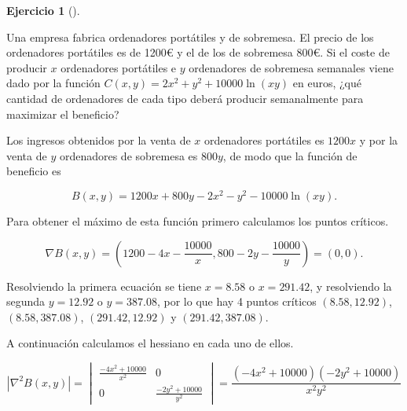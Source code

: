 \documentclass[
  spanish,
  a4paper,
]{scrreport}
\theoremstyle{definition}
\newtheorem{exercise}{Ejercicio}[chapter]
\theoremstyle{remark}
\begin{document}
\begin{exercise}[]\protect\hypertarget{exr-maximizacion-beneficio}{}\label{exr-maximizacion-beneficio}

Una empresa fabrica ordenadores portátiles y de sobremesa. El precio de
los ordenadores portátiles es de 1200€ y el de los de sobremesa 800€. Si
el coste de producir \(x\) ordenadores portátiles e \(y\) ordenadores de
sobremesa semanales viene dado por la función
\(C(x,y)=2x^2+y^2+10000\ln(xy)\) en euros, ¿qué cantidad de ordenadores
de cada tipo deberá producir semanalmente para maximizar el beneficio?

\end{exercise}

\begin{tcolorbox}[enhanced jigsaw, arc=.35mm, bottomrule=.15mm, bottomtitle=1mm, breakable, colback=white, colbacktitle=quarto-callout-tip-color!10!white, colframe=quarto-callout-tip-color-frame, coltitle=black, left=2mm, leftrule=.75mm, opacityback=0, opacitybacktitle=0.6, rightrule=.15mm, title=\textcolor{quarto-callout-tip-color}{\faLightbulb}\hspace{0.5em}{Solución}, titlerule=0mm, toprule=.15mm, toptitle=1mm]

Los ingresos obtenidos por la venta de \(x\) ordenadores portátiles es
\(1200x\) y por la venta de \(y\) ordenadores de sobremesa es \(800y\),
de modo que la función de beneficio es

\[
B(x,y) = 1200x + 800y - 2x^2 - y^2 - 10000\ln(xy).
\]

Para obtener el máximo de esta función primero calculamos los puntos
críticos.

\[
\nabla B(x,y) 
= \left(1200-4x-\frac{10000}{x}, 800-2y-\frac{10000}{y}\right) = (0,0).
\]

Resolviendo la primera ecuación se tiene \(x=8.58\) o \(x=291.42\), y
resolviendo la segunda \(y=12.92\) o \(y=387.08\), por lo que hay 4
puntos críticos \((8.58, 12.92)\), \((8.58, 387.08)\),
\((291.42, 12.92)\) y \((291.42, 387.08)\).

A continuación calculamos el hessiano en cada uno de ellos.

\[
|\nabla^2B(x,y)|=
\begin{vmatrix}
\frac{-4x^2+10000}{x^2} & 0 \\
0 & \frac{-2y^2+10000}{y^2}
\end{vmatrix}
= \frac{(-4x^2+10000)(-2y^2+10000)}{x^2y^2}
\]


\end{tcolorbox}
\end{document}
